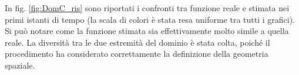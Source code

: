 \documentclass[a4paper,11pt,twoside,openright]{book}							%
\begin{document}
In fig. \ref{fig:DomC_ris} sono riportati i confronti tra funzione reale e stimata nei primi istanti di tempo (la scala di colori è stata resa uniforme tra tutti i grafici). Si può notare come la funzione stimata sia effettivamente molto simile a quella reale. La diversità tra le due estremità del dominio è stata colta, poiché il procedimento ha considerato correttamente la definizione della geometria spaziale.
\newpage
\begin{figure}[H]
\centering
\end{figure}
\end{document}
